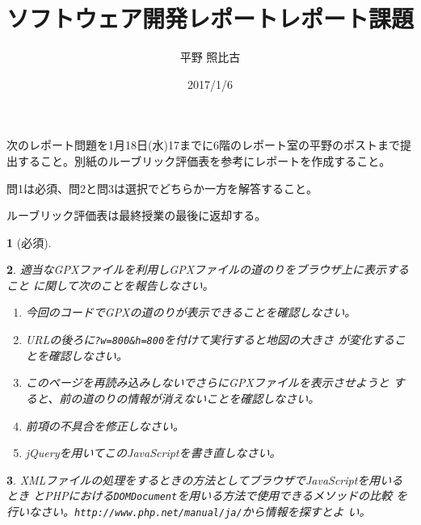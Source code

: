 \documentclass[a4j]{jarticle}
\title{ソフトウェア開発レポートレポート課題}
\author{平野 照比古}
\date{2017/1/6}
\newtheorem{Prob}{}
\begin{document}
\maketitle
次のレポート問題を1月18日(水)17までに6階のレポート室の平野のポストまで提
出すること。別紙のルーブリック評価表を参考にレポートを作成すること。

問1は必須、問2と問3は選択でどちらか一方を解答すること。

ルーブリック評価表は最終授業の最後に返却する。
\begin{Prob}[必須]\upshape
 
\end{Prob}\newpage
\begin{Prob}\upshape
 適当なGPXファイルを利用しGPXファイルの道のりをブラウザ上に表示すること
 に関して次のことを報告しなさい。
 \begin{enumerate}
	\item 今回のコードでGPXの道のりが表示できることを確認しなさい。
	\item URLの後ろに\texttt{?w=800\&h=800}を付けて実行すると地図の大きさ
				が変化することを確認しなさい。
	\item このページを再読み込みしないでさらにGPXファイルを表示させようと
				すると、前の道のりの情報が消えないことを確認しなさい。
	\item 前項の不具合を修正しなさい。
	\item jQueryを用いてこのJavaScriptを書き直しなさい。
 \end{enumerate}
\end{Prob}
\begin{Prob}\upshape
 XMLファイルの処理をするときの方法としてブラウザでJavaScriptを用いるとき
 とPHPにおける\texttt{DOMDocument}を用いる方法で使用できるメソッドの比較
 を行いなさい。\texttt{http://www.php.net/manual/ja/}から情報を探すとよ
 い。
\end{Prob}
\end{document}

